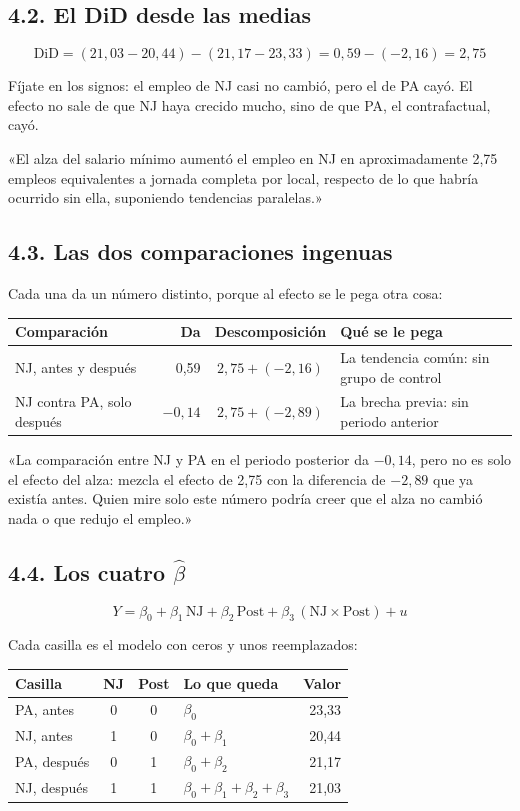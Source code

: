 \documentclass[11pt,letterpaper]{article}
\newcommand{\tema}[1]{\subsection*{#1}}
\begin{document}
\tema{4.2. El DiD desde las medias}

\[
\text{DiD}=(21{,}03-20{,}44)-(21{,}17-23{,}33)=0{,}59-(-2{,}16)=2{,}75
\]

Fíjate en los signos: el empleo de NJ casi no cambió, pero el de PA cayó. El efecto no sale de que NJ haya crecido mucho, sino de que PA, el contrafactual, cayó.

\begin{frase}
«El alza del salario mínimo aumentó el empleo en NJ en aproximadamente 2,75 empleos equivalentes a jornada completa por local, respecto de lo que habría ocurrido sin ella, suponiendo tendencias paralelas.»
\end{frase}

\tema{4.3. Las dos comparaciones ingenuas}

Cada una da un número distinto, porque al efecto se le pega otra cosa:

\begin{center}
\small\begin{tabular}{lrcl}
\toprule
\textbf{Comparación} & \textbf{Da} & \textbf{Descomposición} & \textbf{Qué se le pega} \\
\midrule
NJ, antes y después & 0,59 & $2{,}75+(-2{,}16)$ & La tendencia común: sin grupo de control \\
NJ contra PA, solo después & $-0{,}14$ & $2{,}75+(-2{,}89)$ & La brecha previa: sin periodo anterior \\
\bottomrule
\end{tabular}
\end{center}

\begin{frase}
«La comparación entre NJ y PA en el periodo posterior da $-0{,}14$, pero no es solo el efecto del alza: mezcla el efecto de 2,75 con la diferencia de $-2{,}89$ que ya existía antes. Quien mire solo este número podría creer que el alza no cambió nada o que redujo el empleo.»
\end{frase}

\tema{4.4. Los cuatro $\hat\beta$}

\[
Y=\beta_0+\beta_1\,\text{NJ}+\beta_2\,\text{Post}+\beta_3\,(\text{NJ}\times\text{Post})+u
\]

Cada casilla es el modelo con ceros y unos reemplazados:

\begin{center}
\begin{tabular}{lcclr}
\toprule
\textbf{Casilla} & NJ & Post & \textbf{Lo que queda} & \textbf{Valor} \\
\midrule
PA, antes & 0 & 0 & $\beta_0$ & 23,33 \\
NJ, antes & 1 & 0 & $\beta_0+\beta_1$ & 20,44 \\
PA, después & 0 & 1 & $\beta_0+\beta_2$ & 21,17 \\
NJ, después & 1 & 1 & $\beta_0+\beta_1+\beta_2+\beta_3$ & 21,03 \\
\bottomrule
\end{tabular}
\end{center}
\end{document}
